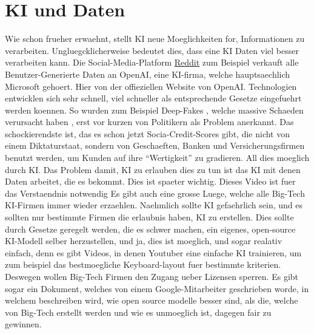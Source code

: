 \documentclass{report}
\begin{document}
\section{KI und Daten}
Wie schon frueher erwaehnt, stellt KI neue Moeglichkeiten for, Informationen zu verarbeiten. Ungluegcklicherweise bedeutet dies, dass eine KI Daten viel besser verarbeiten kann.
Die Social-Media-Platform \hyperlink{reddit.com}{Reddit} zum Beispiel verkauft alle Benutzer-Generierte Daten an OpenAI, eine KI-firma, welche hauptsaechlich Microsoft gehoert. \citep{openai-site}
Hier von der offieziellen Website von OpenAI. \citep{openai-reddit-deal}
\newline
\newline
Technologien entwicklen sich sehr schnell, viel schneller als entsprechende Gesetze eingefuehrt werden koennen. So wurden zum Beispiel Deep-Fakes \citep{deepfakes}, welche massive Schaeden verursacht haben \citep{deepfakes-scam}, erst vor kurzen von Politikern als Problem anerkannt.
\newline
\newline
Das schockierendste ist, das es schon jetzt Socia-Credit-Scores gibt, die nicht von einem Diktaturstaat, sondern von Geschaeften, Banken und Versicherungsfirmen benutzt werden, um Kunden auf ihre \enquote{Wertigkeit} zu gradieren. All dies moeglich durch KI.
Das Problem damit, KI zu erlauben dies zu tun ist das KI mit denen Daten arbeitet, die es bekommt. Dies ist spaeter wichtig.
\citep{ai-social-credit-scores} Dieses Video ist fuer das Verstaendnis notwendig
\newline
\newline
Es gibt auch eine grosse Luege, welche alle Big-Tech KI-Firmen immer wieder erzaehlen. Naehmlich sollte KI gefaehrlich sein, und es sollten nur bestimmte Firmen die erlaubnis haben, KI zu erstellen. Dies sollte durch Gesetze geregelt werden, die es schwer machen, ein eigenes, open-source KI-Modell selber herzustellen, und ja, dies ist moeglich, und sogar realativ einfach, denn es gibt Videos, in denen Youtuber eine einfache KI trainieren, um zum beispiel das bestmoegliche Keyboard-layout fuer bestimmte kriterien. Deswegen wollen Big-Tech Firmen den Zugang ueber Lizensen sperren. \citep{training-an-ai-model}
\newline
\citep{ai-lobbying}
\newline
\citep{}
\newline
Es gibt sogar ein Dokument, welches von einem Google-Mitarbeiter geschrieben worde, in welchem beschreiben wird, wie open source modelle besser sind, als die, welche von Big-Tech erstellt werden und wie es unmoeglich ist, dagegen fair zu gewinnen. \citep{google-enginner-says-big-ai-sucks}
\end{document}
